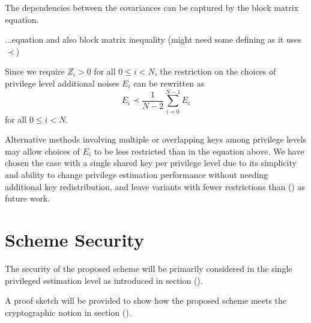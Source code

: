 \documentclass[conference]{IEEEtran}
\theoremstyle{definition}
\theoremstyle{definition}
\theoremstyle{remark}
\begin{document}
The dependencies between the covariances can be captured by the block matrix equation.

...equation and also block matrix inequality (might need some defining as it uses $\prec$)

Since we require $Z_i>0$ for all $0 \leq i < N$, the restriction on the choices of privilege level additional noises $E_i$ can be rewritten as
\begin{equation}
   E_i \prec \frac{1}{N-2}\sum_{i=0}^{N-1}E_i
\end{equation}
for all $0 \leq i < N$.

Alternative methods involving multiple or overlapping keys among privilege levels may allow choices of $E_i$ to be less restricted than in the equation above. We have chosen the case with a single shared key per privilege level due to its simplicity and ability to change privilege estimation performance without needing additional key redistribution, and leave variants with fewer restrictions than () as future work.

% 
%                                                                                        
%                                                                                        
%                                                                                        
% 

\section{Scheme Security}
The security of the proposed scheme will be primarily considered in the single privileged estimation level as introduced in section ().

A proof sketch will be provided to show how the proposed scheme meets the cryptographic notion in section ().
\end{document}
